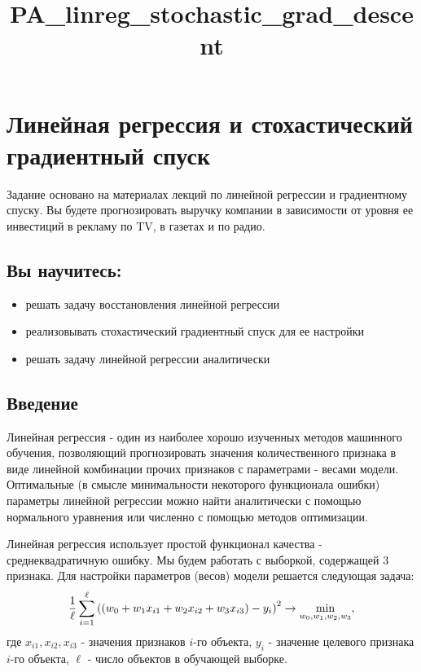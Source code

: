 \documentclass[11pt]{article}
\title{PA\_linreg\_stochastic\_grad\_descent}
\providecommand{\tightlist}{%
      \setlength{\itemsep}{0pt}\setlength{\parskip}{0pt}}
\begin{document}
    
    
    \maketitle
    
    

    
    \section{Линейная регрессия и стохастический градиентный
спуск}\label{ux43bux438ux43dux435ux439ux43dux430ux44f-ux440ux435ux433ux440ux435ux441ux441ux438ux44f-ux438-ux441ux442ux43eux445ux430ux441ux442ux438ux447ux435ux441ux43aux438ux439-ux433ux440ux430ux434ux438ux435ux43dux442ux43dux44bux439-ux441ux43fux443ux441ux43a}

    Задание основано на материалах лекций по линейной регрессии и
градиентному спуску. Вы будете прогнозировать выручку компании в
зависимости от уровня ее инвестиций в рекламу по TV, в газетах и по
радио.

    \subsection{Вы
научитесь:}\label{ux432ux44b-ux43dux430ux443ux447ux438ux442ux435ux441ux44c}

\begin{itemize}
\tightlist
\item
  решать задачу восстановления линейной регрессии
\item
  реализовывать стохастический градиентный спуск для ее настройки
\item
  решать задачу линейной регрессии аналитически
\end{itemize}

    \subsection{Введение}\label{ux432ux432ux435ux434ux435ux43dux438ux435}

Линейная регрессия - один из наиболее хорошо изученных методов машинного
обучения, позволяющий прогнозировать значения количественного признака в
виде линейной комбинации прочих признаков с параметрами - весами модели.
Оптимальные (в смысле минимальности некоторого функционала ошибки)
параметры линейной регрессии можно найти аналитически с помощью
нормального уравнения или численно с помощью методов оптимизации.

    Линейная регрессия использует простой функционал качества -
среднеквадратичную ошибку. Мы будем работать с выборкой, содержащей 3
признака. Для настройки параметров (весов) модели решается следующая
задача:
\[\Large \frac{1}{\ell}\sum_{i=1}^\ell{{((w_0 + w_1x_{i1} + w_2x_{i2} +  w_3x_{i3}) - y_i)}^2} \rightarrow \min_{w_0, w_1, w_2, w_3},\]
где \(x_{i1}, x_{i2}, x_{i3}\) - значения признаков \(i\)-го объекта,
\(y_i\) - значение целевого признака \(i\)-го объекта, \(\ell\) - число
объектов в обучающей выборке.
\end{document}
